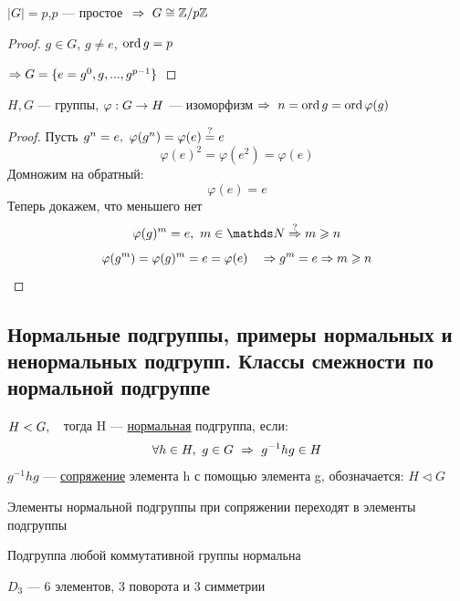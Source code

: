 \documentclass[main]{subfiles}
\begin{document}
	\begin{utv}
	    $|G|=p$,\q $p$ --- простое $\ \Rightarrow\  G \cong \mathbb{Z} /p \mathbb{Z}$
	\end{utv}

	\begin{proof}
	    $g \in G$, $g \neq e$, $\mathop{\rm ord}\nolimits g=p$

	    $\Rightarrow G=\{e=g^0,g,...,g^{p-1}\}$
	\end{proof}

	\begin{utv}
	    $H,G$ --- группы, $\varphi: G \rightarrow H$ --- изоморфизм $\Rightarrow$ $n=\mathop{\rm ord}\nolimits g=\mathop{\rm ord}\nolimits \varphi(g)$
	\end{utv}

	\begin{proof}
	    Пусть $g^n=e,\ \varphi(g^n)=\varphi(e)\os{?}{=}e$
	    \[\varphi(e)^2=\varphi(e^2)=\varphi(e)\]
		Домножим на обратный:
		\[\varphi(e) = e\]
	    Теперь докажем, что меньшего нет
	    \[\varphi(g)^m = e,\ m \in \N \os{?}{\Ra} m \geqslant n\]
		\[\varphi(g^m) = \varphi(g)^m = e = \varphi(e) \quad \Rightarrow g^m = e \Rightarrow m \geqslant n\]
	\end{proof}

	\newpage
	\subsection{Нормальные подгруппы, примеры нормальных и ненормальных подгрупп. Классы смежности по нормальной подгруппе}
	\begin{definition}
	    $H<G,\quad$тогда H --- \ul{нормальная} подгруппа, если:
		\[\forall h \in H,\ g \in G \ \Rightarrow\  g^{-1}h g \in H\]
		$g^{-1}h g$ --- \ul{сопряжение} элемента h с помощью элемента g, обозначается: $H \triangleleft G$
	\end{definition}

	\begin{remark}
	    Элементы нормальной подгруппы при сопряжении переходят в элементы подгруппы
	\end{remark}

	\begin{remark}
	    Подгруппа любой коммутативной группы нормальна
	\end{remark}

	\begin{example}
	    $D_3$ --- 6 элементов, 3 поворота и 3 симметрии

	\end{example}
\end{document}
